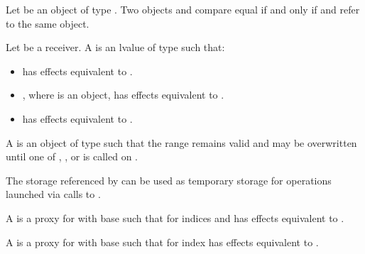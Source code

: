 \pnum
Let  be an object of type .
Two objects  and  compare equal if and only if
 and
 refer to the same object.

\pnum
Let  be a receiver.
A  is
an lvalue  of type  such that:
\begin{itemize}
\item
{} has effects equivalent to
.
\item
{}, where  is an  object,
has effects equivalent to .
\item
{} has effects equivalent to
.
\end{itemize}

\pnum
A   is
an object  of type 
such that the range  remains valid and may be overwritten
until one of , , or 
is called on .
\begin{note}
The storage referenced by  can be used as temporary storage
for operations launched via calls to .
\end{note}

\pnum
A 
is a proxy  for 
with base 
such that
 for indices  and 
has effects equivalent to .

\pnum
A 
is a proxy  for 
with base 
such that
 for index 
has effects equivalent to .


